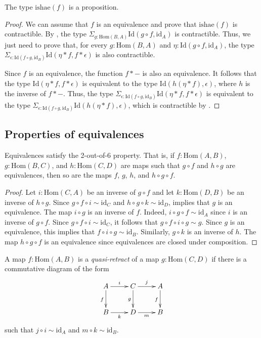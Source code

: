 \documentclass[reqno]{amsart}
\theoremstyle{definition}
\theoremstyle{remark}
\newcommand{\fs}[1]{\mathrm{#1}}
\newcommand{\Hom}{\fs{Hom}}
\newcommand{\Id}{\fs{Id}}
\newcommand{\id}{\fs{id}}
\numberwithin{figure}{section}
\begin{document}
\begin{prop}
The type $\fs{ishae}(f)$ is a proposition.
\end{prop}
\begin{proof}
We can assume that $f$ is an equivalence and prove that $\fs{ishae}(f)$ is contractible.
By , the type $\Sigma_{g : \Hom(B,A)} \Id(g \circ f, \id_A)$ is contractible.
Thus, we just need to prove that, for every $g : \Hom(B,A)$ and $\eta : \Id(g \circ f, \id_A)$, the type $\Sigma_{\epsilon : \Id(f \circ g, \id_B)} \Id(\eta * f, f * \epsilon)$ is also contractible.

Since $f$ is an equivalence, the function $f * -$ is also an equivalence.
It follows that the type $\Id(\eta * f, f * \epsilon)$ is equivalent to the type $\Id(h(\eta * f), \epsilon)$, where $h$ is the inverse of $f * -$.
Thus, the type $\Sigma_{\epsilon : \Id(f \circ g, \id_B)} \Id(\eta * f, f * \epsilon)$ is equivalent to the type $\Sigma_{\epsilon : \Id(f \circ g, \id_B)} \Id(h(\eta * f), \epsilon)$, which is contractible by \cite[Lemma~3.11.8]{hottbook}.
\end{proof}

\subsection{Properties of equivalences}

\begin{prop}
Equivalences satisfy the 2-out-of-6 property.
That is, if $f : \Hom(A,B)$, $g : \Hom(B,C)$, and $h : \Hom(C,D)$ are maps such that $g \circ f$ and $h \circ g$ are equivalences, then so are the maps $f$, $g$, $h$, and $h \circ g \circ f$.
\end{prop}
\begin{proof}
Let $i : \Hom(C,A)$ be an inverse of $g \circ f$ and let $k : \Hom(D,B)$ be an inverse of $h \circ g$.
Since $g \circ f \circ i \sim \id_C$ and $h \circ g \circ k \sim \id_D$,  implies that $g$ is an equivalence.
The map $i \circ g$ is an inverse of $f$.
Indeed, $i \circ g \circ f \sim \id_A$ since $i$ is an inverse of $g \circ f$.
Since $g \circ f \circ i \sim \id_C$, it follows that $g \circ f \circ i \circ g \sim g$.
Since $g$ is an equivalence, this implies that $f \circ i \circ g \sim \id_B$.
Similarly, $g \circ k$ is an inverse of $h$.
The map $h \circ g \circ f$ is an equivalence since equivalences are closed under composition.
\end{proof}

A map $f : \Hom(A,B)$ is a \emph{quasi-retract} of a map $g : \Hom(C,D)$ if there is a commutative diagram of the form
\[ \xymatrix{ A \ar[r]^i \ar[d]_f & C \ar[r]^j \ar[d]_g & A \ar[d]_f \\
              B \ar[r]_k          & D \ar[r]_m          & B
            } \]
such that $j \circ i \sim \id_A$ and $m \circ k \sim \id_B$.
\end{document}
